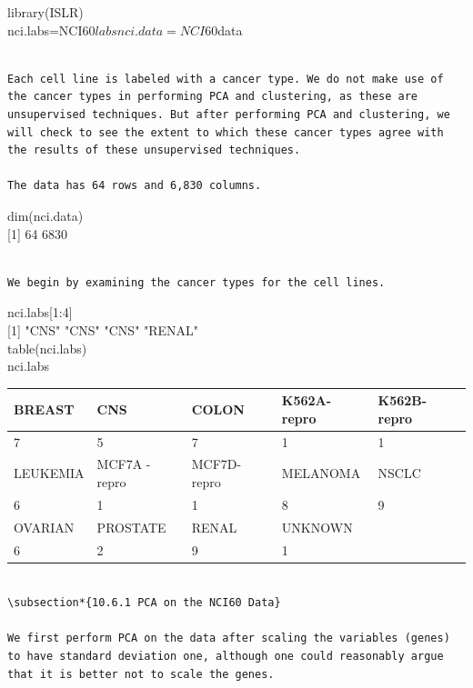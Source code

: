 \documentclass[10pt]{article}
\begin{document}
\begin{displayquote}
library(ISLR)\\
nci.labs=NCI60$labs
nci.data=NCI60$data
\end{displayquote}

\begin{verbatim}

Each cell line is labeled with a cancer type. We do not make use of the cancer types in performing PCA and clustering, as these are unsupervised techniques. But after performing PCA and clustering, we will check to see the extent to which these cancer types agree with the results of these unsupervised techniques.

The data has 64 rows and 6,830 columns.
\end{verbatim}

\begin{displayquote}
dim(nci.data)\\[0pt]
[1] 64 6830
\end{displayquote}

\begin{verbatim}

We begin by examining the cancer types for the cell lines.
\end{verbatim}

\begin{displayquote}
nci.labs[1:4]\\[0pt]
[1] "CNS" "CNS" "CNS" "RENAL"\\
table(nci.labs)\\
nci.labs
\end{displayquote}

\begin{center}
\begin{tabular}{|l|l|l|l|l|}
\hline
BREAST & CNS & COLON & K562A-repro & K562B-repro \\
\hline
7 & 5 & 7 & 1 & 1 \\
\hline
LEUKEMIA & MCF7A -repro & MCF7D-repro & MELANOMA & NSCLC \\
\hline
6 & 1 & 1 & 8 & 9 \\
\hline
OVARIAN & PROSTATE & RENAL & UNKNOWN &  \\
\hline
6 & 2 & 9 & 1 &  \\
\hline
\end{tabular}
\end{center}

\begin{verbatim}

\subsection*{10.6.1 PCA on the NCI60 Data}

We first perform PCA on the data after scaling the variables (genes) to have standard deviation one, although one could reasonably argue that it is better not to scale the genes.
\end{verbatim}
\end{document}
